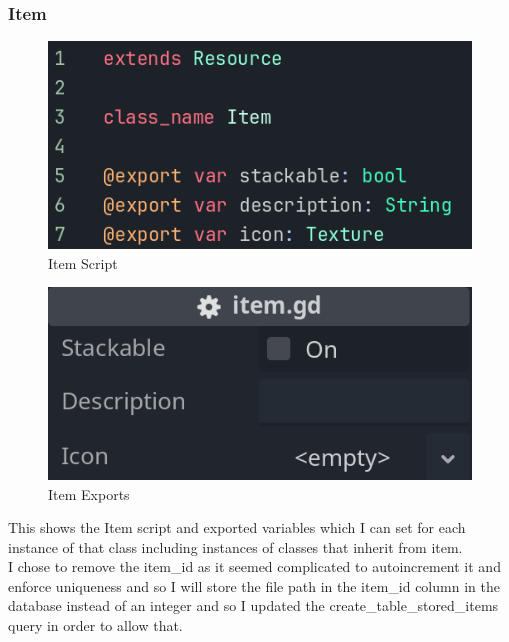 \documentclass{article}
\begin{document}
        \subsubsection{Item}
        \begin{multicols}{2}
                \begin{figure}[H]
                        \centering
                        \includegraphics[width = 0.9\columnwidth]{images/development/Item_script.PNG}
                        \caption{Item Script}
                \end{figure}
                \begin{figure}[H]
                        \centering
                        \includegraphics[width = 0.9\columnwidth]{images/development/Item_export.PNG}
                        \caption{Item Exports}
                \end{figure}
        \end{multicols}
        \[\]
        This shows the Item script and exported variables which I can set for each instance of that class including instances of classes that inherit from item.\\
        I chose to remove the item\_id as it seemed complicated to autoincrement it and enforce uniqueness and so I will store the file path in the item\_id column in the database instead of an integer and so I updated the create\_table\_stored\_items query in order to allow that.\\
        \newpage
\end{document}
